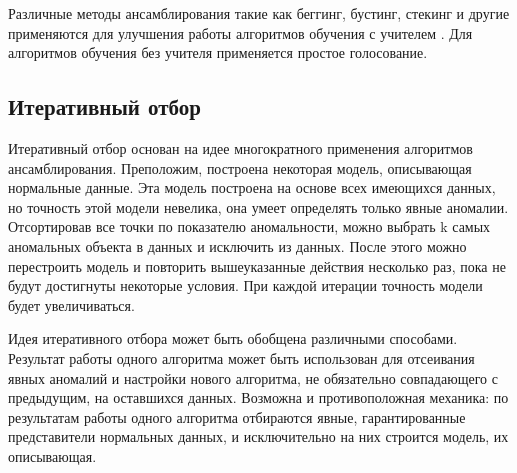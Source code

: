 Различные методы ансамблирования такие как беггинг, бустинг, стекинг и другие применяются для улучшения работы алгоритмов обучения с учителем . Для алгоритмов обучения без учителя применяется простое голосование\cite{Book16}.
\subsection{Итеративный отбор}
Итеративный отбор основан на идее многократного применения алгоритмов ансамблирования. Преположим, построена некоторая модель, описывающая нормальные данные. Эта модель построена на основе всех  имеющихся данных, но точность этой модели невелика, она умеет определять только явные аномалии. Отсортировав все точки по показателю аномальности, можно выбрать k самых аномальных объекта в данных и исключить из данных. После этого можно перестроить модель и повторить вышеуказанные действия несколько раз, пока не будут достигнуты некоторые условия. При каждой итерации точность модели будет увеличиваться.

Идея итеративного отбора может быть обобщена различными способами. Результат работы одного алгоритма может быть использован для отсеивания явных аномалий и настройки нового алгоритма, не обязательно совпадающего с предыдущим, на оставшихся данных. Возможна и противоположная механика: по результатам работы одного алгоритма отбираются явные, гарантированные
представители нормальных данных, и исключительно на них строится модель, их описывающая.


